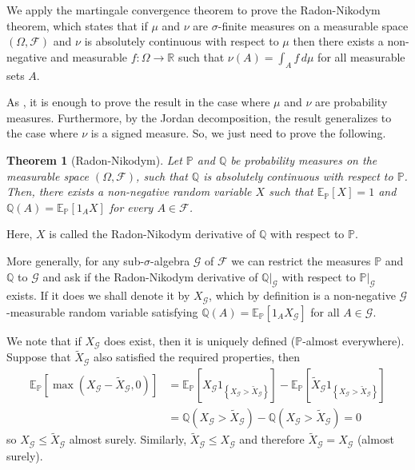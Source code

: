 \documentclass[12pt]{article}
\newtheorem*{theorem*}{Theorem}
\begin{document}
We apply the martingale convergence theorem to prove the Radon-Nikodym theorem, which states that if $\mu$ and $\nu$ are $\sigma$-finite measures on a measurable space $(\Omega,\mathcal{F})$ and $\nu$ is absolutely continuous with respect to $\mu$ then there exists a non-negative and measurable $f\colon\Omega\rightarrow\mathbb{R}$ such that $\nu(A)=\int_Af\,d\mu$ for all measurable sets $A$.

As , it is enough to prove the result in the case where $\mu$ and $\nu$ are probability measures. Furthermore, by the Jordan decomposition, the result generalizes to the case where $\nu$ is a signed measure. So, we just need to prove the following.

\begin{theorem*}[Radon-Nikodym]
Let $\mathbb{P}$ and $\mathbb{Q}$ be probability measures on the measurable space $(\Omega,\mathcal{F})$, such that $\mathbb{Q}$ is absolutely continuous with respect to $\mathbb{P}$.
Then, there exists a non-negative random variable $X$ such that $\mathbb{E}_\mathbb{P}[X]=1$ and $\mathbb{Q}(A)=\mathbb{E}_\mathbb{P}[1_AX]$ for every $A\in\mathcal{F}$.
\end{theorem*}

Here, $X$ is called the Radon-Nikodym derivative of $\mathbb{Q}$ with respect to $\mathbb{P}$.

More generally, for any sub-$\sigma$-algebra $\mathcal{G}$ of $\mathcal{F}$ we can restrict the measures $\mathbb{P}$ and $\mathbb{Q}$ to $\mathcal{G}$ and ask if the Radon-Nikodym derivative of $\mathbb{Q}|_\mathcal{G}$ with respect to $\mathbb{P}|_\mathcal{G}$ exists. If it does we shall denote it by $X_\mathcal{G}$, which by definition is a non-negative $\mathcal{G}$-measurable random variable satisfying $\mathbb{Q}(A)=\mathbb{E}_\mathbb{P}[1_AX_\mathcal{G}]$ for all $A\in\mathcal{G}$.

We note that if $X_\mathcal{G}$ does exist, then it is uniquely defined ($\mathbb{P}$-almost everywhere). Suppose that $\tilde X_{\mathcal{G}}$ also satisfied the required properties, then
\begin{equation*}\begin{split}
\mathbb{E}_{\mathbb{P}}[\max(X_{\mathcal{G}}-\tilde X_{\mathcal{G}},0)]
&=\mathbb{E}_{\mathbb{P}}[X_\mathcal{G}1_{\left\{X_{\mathcal{G}}>\tilde X_{\mathcal{G}}\right\}}]-\mathbb{E}_{\mathbb{P}}[\tilde X_\mathcal{G}1_{\left\{X_{\mathcal{G}}>\tilde X_{\mathcal{G}}\right\}}]\\
&=\mathbb{Q}(X_{\mathcal{G}}>\tilde X_{\mathcal{G}})-\mathbb{Q}(X_{\mathcal{G}}>\tilde X_{\mathcal{G}})=0
\end{split}\end{equation*}
so $X_\mathcal{G}\le \tilde X_\mathcal{G}$ almost surely. Similarly, $\tilde X_\mathcal{G}\le X_\mathcal{G}$ and therefore $\tilde X_\mathcal{G}= X_\mathcal{G}$ (almost surely).
\end{document}
